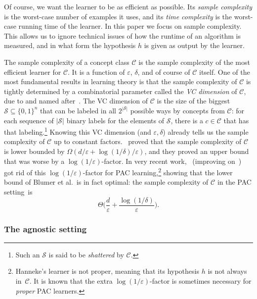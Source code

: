 \documentclass[twoside,11pt]{article}
\newcommand{\eps}{\varepsilon}
\newcommand{\Sh}{\ensuremath{\mathcal{S}}}
\def\01{\{0,1\}}
\newcommand{\C}{\ensuremath{\mathscr{C}}}
\begin{document}
Of course, we want the learner to be as efficient as possible.  Its \emph{sample complexity} is the worst-case number of examples it uses, and its \emph{time complexity} is the worst-case running time of the learner. In this paper we focus on sample complexity.  This allows us to ignore technical issues of how the runtime of an algorithm is measured, and in what form the hypothesis $h$ is given as output by the learner.

The sample complexity of a concept class $\C$ is the sample complexity of the most efficient learner for $\C$. It is a function of $\eps$, $\delta$, and of course of $\C$ itself.  One of the most fundamental results in learning theory is that the sample complexity of $\C$ is tightly determined by a combinatorial parameter called the \emph{VC dimension} of $\C$, due to and named after~\cite{vapnik:vcdimension}. The VC dimension of $\C$ is the size of the biggest $\Sh\subseteq\01^n$ that can be labeled in all $2^{|\Sh|}$ possible ways by concepts from $\C$: for each sequence of $|\Sh|$ binary labels for the elements of $\Sh$, there is a $c\in\C$ that has that labeling.\footnote{Such an $\Sh$ is said to be \emph{shattered} by $\C$.}
Knowing this VC dimension (and $\eps,\delta$) already tells us the sample complexity of $\C$ up to constant factors.~\cite{blumer:optimalpacupper} proved that the sample complexity of $\C$ is lower bounded by $\Omega(d/\eps + \log(1/\delta)/\eps)$,
and they proved an upper bound that was worse by a $\log(1/\eps)$-factor.
In very recent work,~\cite{hanneke:optimalpaclower} (improving on~\cite{simon:almostoptimalpac}) got rid of this $\log(1/\eps)$-factor for PAC learning,\footnote{Hanneke's learner is not proper, meaning that its hypothesis $h$ is not always in~$\C$. It is known that the extra $\log(1/\eps)$-factor is sometimes necessary for \emph{proper} PAC learners.} showing that the lower bound of Blumer et al.\ is in fact optimal: the sample complexity of $\C$ in the PAC setting~is
\begin{equation}\label{eq:samplecomplpac}
\Theta\Big(\frac{d}{\eps} + \frac{\log(1/\delta)}{\eps}\Big).
\end{equation}
\subsubsection{The agnostic setting}
\end{document}
